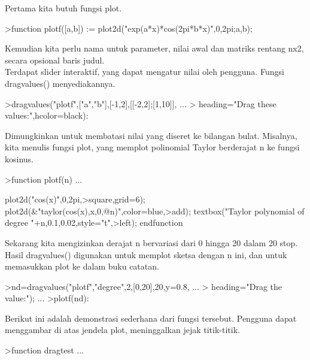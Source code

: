 \documentclass[a4paper,10pt]{article}
\begin{document}
\begin{eulernotebook}
\begin{eulercomment}
\begin{eulercomment}
\begin{eulercomment}
\begin{eulercomment}
\begin{eulercomment}
\begin{eulercomment}
\begin{eulercomment}
\begin{eulercomment}
\begin{eulercomment}
\begin{eulercomment}
\begin{eulercomment}
Pertama kita butuh fungsi plot.
\end{eulercomment}
\begin{eulerprompt}
>function plotf([a,b]) := plot2d("exp(a*x)*cos(2pi*b*x)",0,2pi;a,b);
\end{eulerprompt}
\begin{eulercomment}
Kemudian kita perlu nama untuk parameter, nilai awal dan matriks
rentang nx2, secara opsional baris judul.\\
Terdapat slider interaktif, yang dapat mengatur nilai oleh pengguna.
Fungsi dragvalues() menyediakannya.
\end{eulercomment}
\begin{eulerprompt}
>dragvalues("plotf",["a","b"],[-1,2],[[-2,2];[1,10]], ...
>  heading="Drag these values:",hcolor=black):
\end{eulerprompt}
\begin{eulercomment}
Dimungkinkan untuk membatasi nilai yang diseret ke bilangan bulat.
Misalnya, kita menulis fungsi plot, yang memplot polinomial Taylor
berderajat n ke fungsi kosinus.
\end{eulercomment}
\begin{eulerprompt}
>function plotf(n) ...
\end{eulerprompt}
\begin{eulerudf}
  plot2d("cos(x)",0,2pi,>square,grid=6);
  plot2d(&"taylor(cos(x),x,0,@n)",color=blue,>add);
  textbox("Taylor polynomial of degree "+n,0.1,0.02,style="t",>left);
  endfunction
\end{eulerudf}
\begin{eulercomment}
Sekarang kita mengizinkan derajat n bervariasi dari 0 hingga 20 dalam
20 stop. Hasil dragvalues() digunakan untuk memplot sketsa dengan n
ini, dan untuk memasukkan plot ke dalam buku catatan.
\end{eulercomment}
\begin{eulerprompt}
>nd=dragvalues("plotf","degree",2,[0,20],20,y=0.8, ...
>   heading="Drag the value:"); ...
>plotf(nd):
\end{eulerprompt}
\begin{eulercomment}
Berikut ini adalah demonstrasi sederhana dari fungsi tersebut.
Pengguna dapat menggambar di atas jendela plot, meninggalkan jejak
titik-titik.
\end{eulercomment}
\begin{eulerprompt}
>function dragtest ...
\end{eulerprompt}

\end{eulercomment}
\end{eulercomment}
\end{eulercomment}
\end{eulercomment}
\end{eulercomment}
\end{eulercomment}
\end{eulercomment}
\end{eulercomment}
\end{eulercomment}
\end{eulercomment}
\end{eulernotebook}
\end{document}
